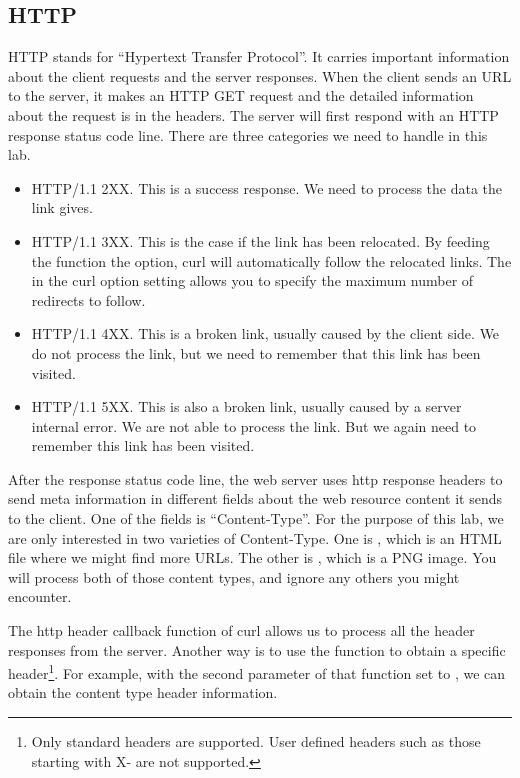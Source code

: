 \subsection{HTTP}
HTTP stands for ``Hypertext Transfer Protocol''. It carries important information about the client requests and the server responses. When the client sends an URL to the server, it makes an HTTP GET request and the detailed information about the request is in the headers. The server will first respond with an HTTP response status code line. There are three categories we need to handle in this lab.
\begin{itemize}
\item HTTP/1.1 2XX. This is a success response. We need to process the data the link gives.
\item HTTP/1.1 3XX. This is the case if the link has been relocated. By feeding the  function the  option, curl will automatically follow the relocated links.  The  in the curl option setting allows you to specify the maximum number of redirects to follow.
\item HTTP/1.1 4XX. This is a broken link, usually caused by the client side. We do not process the link, but we need to remember that this link has been visited.
\item HTTP/1.1 5XX. This is also a broken link, usually caused by a server internal error. We are not able to process the link. But we again need to remember this link has been visited.
\end{itemize}

After the response status code line, the web server uses http response headers to send meta information in different fields about the web resource content it sends to the client. One of the fields is ``Content-Type''. For the purpose of this lab, we are only interested in two varieties of Content-Type. One is , which is an HTML file where we might find more URLs. The other is , which is a PNG image. You will process both of those content types, and ignore any others you might encounter.

The http header callback function of curl allows us to process all the header responses from the server.
Another way is to use the  function to obtain a specific header\footnote{Only standard headers are supported. User defined headers such as those starting with X- are not supported.}. For example, with the second parameter of that function set to , we can obtain the content type header information.

